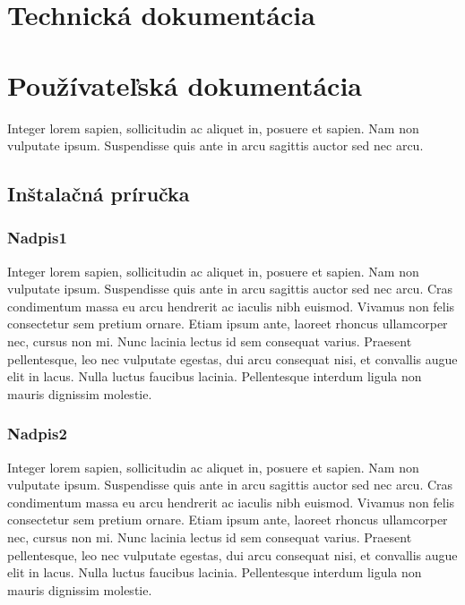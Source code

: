 \newpage
\thispagestyle{plain}

\section{Technická dokumentácia}\label{technical_documentation}

\newpage
\section{Používateľská dokumentácia}
Integer lorem sapien, sollicitudin ac aliquet in, posuere et sapien. Nam non vulputate ipsum. Suspendisse quis ante in arcu sagittis auctor sed nec arcu.

\subsection{Inštalačná príručka}\label{install_guide}

\subsubsection{Nadpis1}
Integer lorem sapien, sollicitudin ac aliquet in, posuere et sapien. Nam non vulputate ipsum. Suspendisse quis ante in arcu sagittis auctor sed nec arcu. Cras condimentum massa eu arcu hendrerit ac iaculis nibh euismod. Vivamus non felis consectetur sem pretium ornare. Etiam ipsum ante, laoreet rhoncus ullamcorper nec, cursus non mi. Nunc lacinia lectus id sem consequat varius. Praesent pellentesque, leo nec vulputate egestas, dui arcu consequat nisi, et convallis augue elit in lacus. Nulla luctus faucibus lacinia. Pellentesque interdum ligula non mauris dignissim molestie.

\subsubsection{Nadpis2}
Integer lorem sapien, sollicitudin ac aliquet in, posuere et sapien. Nam non vulputate ipsum. Suspendisse quis ante in arcu sagittis auctor sed nec arcu. Cras condimentum massa eu arcu hendrerit ac iaculis nibh euismod. Vivamus non felis consectetur sem pretium ornare. Etiam ipsum ante, laoreet rhoncus ullamcorper nec, cursus non mi. Nunc lacinia lectus id sem consequat varius. Praesent pellentesque, leo nec vulputate egestas, dui arcu consequat nisi, et convallis augue elit in lacus. Nulla luctus faucibus lacinia. Pellentesque interdum ligula non mauris dignissim molestie.

